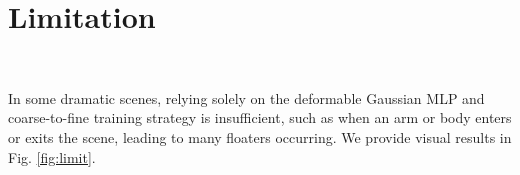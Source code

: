\section{Limitation}~\label{sec:limit}

In some dramatic scenes, relying solely on the deformable Gaussian MLP and coarse-to-fine training strategy is insufficient, such as when an arm or body enters or exits the scene, leading to many floaters occurring. We provide visual results in Fig. \ref{fig:limit}.


